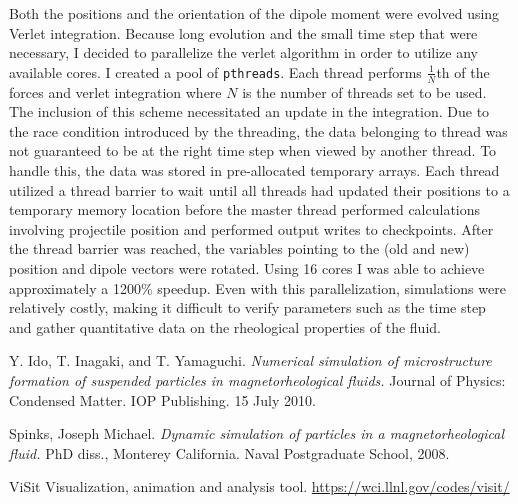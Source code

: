 \begin{multicols*}{2}
Both the positions and the orientation of the dipole moment were
evolved using Verlet integration. Because long evolution and the small
time step that were necessary, I decided to parallelize the verlet
algorithm in order to utilize any available cores. I created a pool of
{\tt pthreads}.  Each thread performs $\frac1N$th of the forces and
verlet integration where $N$ is the number of threads set to be
used. The inclusion of this scheme necessitated an update in the
integration. Due to the race condition introduced by the threading,
the data belonging to thread was not guaranteed to be at the right
time step when viewed by another thread.  To handle this, the data was
stored in pre-allocated temporary arrays.  Each thread utilized a
thread barrier to wait until all threads had updated their positions
to a temporary memory location before the master thread performed
calculations involving projectile position and performed output writes
to checkpoints.  After the thread barrier was reached, the variables
pointing to the (old and new) position and dipole vectors were
rotated. Using 16 cores I was able to achieve approximately a 1200\%
speedup.  Even with this parallelization, simulations were relatively
costly, making it difficult to verify parameters such as the time step
and gather quantitative data on the rheological properties of the
fluid.


\begin{thebibliography}{9}


Y. Ido, T. Inagaki, and T. Yamaguchi. 
\emph{Numerical simulation of microstructure formation of suspended particles in magnetorheological fluids.}  
Journal of Physics: Condensed Matter. 
IOP Publishing.
15 July 2010. 

Spinks, Joseph Michael. 
\emph{Dynamic simulation of particles in a magnetorheological fluid.}
PhD diss., Monterey California. 
Naval Postgraduate School, 2008.

ViSit Visualization, animation and analysis tool.
\newline 
\url{https://wci.llnl.gov/codes/visit/}

\end{thebibliography}



\end{multicols*}



